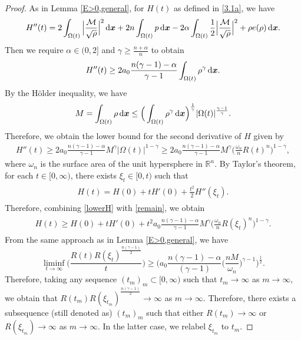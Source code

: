 \documentclass[reqno,11pt]{amsart}
\numberwithin{equation}{section}
\theoremstyle{definition}
\def\dd{{\, \rm d}}
\begin{document}
\begin{proof}
As in Lemma \ref{E>0,general}, for $H(t)$ as defined in \eqref{3.1a},
we have
    \begin{align*}
 H''(t)=2\int_{\Omega(t)}\Big| \frac{\mathcal{M}}{\sqrt{\rho}} \Big|^2\dd \boldsymbol{x}+2n\int_{\Omega(t)}p\dd \boldsymbol{x}-2\alpha\int_{\Omega(t)}\frac{1}{2}\Big| \frac{\mathcal{M}}{\sqrt{\rho}} \Big|^2
 +\rho e(\rho)\dd \boldsymbol{x}.
    \end{align*}
Then we require $\alpha\in(0,2]$ and $\gamma\geq\frac{n+\alpha}{n}$ to obtain
    \begin{align*}
  H''(t)\geq 2a_0\frac{n(\gamma - 1) - \alpha}{\gamma - 1}\int_{\Omega(t)} \rho^\gamma \dd \boldsymbol{x}.
    \end{align*}
By the H\"older inequality, we have
    \[
    M = \int_{\Omega(t)} \rho \dd \boldsymbol{x} 
    \leq \Big ( \int_{\Omega(t)} \rho^\gamma \dd \boldsymbol{x} \Big )^\frac{1}{\gamma} |\Omega(t)|^\frac{\gamma - 1}{\gamma}.
    \]
    Therefore, we obtain the lower bound for the second derivative of $H$ given by
    \begin{align}\label{lowerH}
 H''(t)\geq 2a_0\frac{n(\gamma - 1) - \alpha}{\gamma - 1} M^\gamma |\Omega(t)|^{1 - \gamma} \geq 2a_0\frac{n(\gamma - 1) - \alpha}{\gamma - 1} M^\gamma 
 \Big(\frac{\omega_n}{n}R(t)^n \Big)^{1 - \gamma},
\end{align}
    where $\omega_n$ is the surface area of the unit hypersphere in $\mathbb{R}^n$. 
By Taylor's theorem, for each $t \in [0, \infty)$, there exists $\xi_t \in [0, t)$ such that
    \begin{align}\label{remain}
 \begin{split}
  H(t) = H(0) + tH'(0) + \frac{t^2}{2} H''(\xi_t).
        \end{split}
    \end{align}
    Therefore, combining \eqref{lowerH} with \eqref{remain}, we obtain
    \begin{align*}
  \begin{split}
  H(t) \geq H(0) + tH'(0) + t^2a_0\frac{n(\gamma - 1) - \alpha}{\gamma - 1} M^\gamma \Big(\frac{\omega_n}{n}R(\xi_t)^n \Big)^{1 - \gamma}.
  \end{split}
    \end{align*}
    From the same approach as in Lemma \ref{E>0,general}, we have
    \[
    \liminf_{t\rightarrow\infty}\bigg(\frac{R(t) R(\xi_t)^\frac{n(\gamma - 1)}{2}}{t}\bigg)\geq\bigg(a_0\frac{n(\gamma - 1) - \alpha}{(\gamma - 1)}\Big(\frac{nM}{\omega_n}\Big)^{\gamma - 1}\bigg)^{\frac{1}{2}}.
    \]
    Therefore, taking any sequence $(t_m)_m \subset [0,\infty)$ such that $t_m \to \infty$ as $m \to \infty$, we obtain that
    $R(t_m) R(\xi_{t_m})^\frac{n(\gamma - 1)}{2} \to \infty$ as $m \to \infty$. 
    Therefore, there exists a subsequence (still denoted as) $(t_m)_m$ such that 
    either $R(t_m) \to \infty$ or $R(\xi_{t_m}) \to \infty$ as $m \to \infty$. In the latter case, we relabel $\xi_{t_m}$ to $t_m$.
\end{proof}
\end{document}
